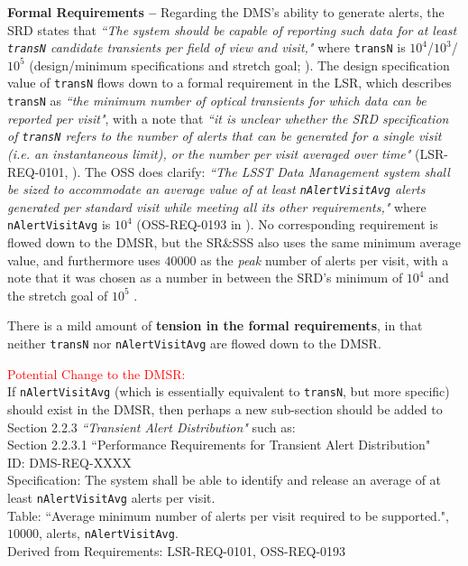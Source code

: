 \documentclass[DM,authoryear,toc]{lsstdoc}
\begin{document}
{\bf Formal Requirements --} Regarding the DMS's ability to generate alerts, the SRD states that {\it ``The system should be capable of reporting such data for at least {\tt transN} candidate transients per field of view and visit,"} where {\tt transN} is $10^4$/$10^3$/$10^5$ (design/minimum specifications and stretch goal; ). The design specification value of {\tt transN} flows down to a formal requirement in the LSR, which describes {\tt transN} as {\it ``the minimum number of optical transients for which data can be reported per visit"}, with a note that {\it ``it is unclear whether the SRD specification of {\tt transN} refers to the number of alerts that can be generated for a single visit (i.e. an instantaneous limit), or the number per visit averaged over time"} (LSR-REQ-0101, ). The OSS does clarify: {\it ``The LSST Data Management system shall be sized to accommodate an average value of at least {\tt nAlertVisitAvg} alerts generated per standard visit while meeting all its other requirements,"} where {\tt nAlertVisitAvg} is $10^4$ (OSS-REQ-0193 in ). No corresponding requirement is flowed down to the DMSR, but the SR\&SSS also uses the same minimum average value, and furthermore uses $40000$ as the {\it peak} number of alerts per visit, with a note that it was chosen as a number in between the SRD's minimum of $10^4$ and the stretch goal of $10^5$ . 

There is a mild amount of {\bf tension in the formal requirements}, in that neither {\tt transN} nor {\tt nAlertVisitAvg} are flowed down to the DMSR. 

\textcolor{red}{Potential Change to the DMSR:} \\
If {\tt nAlertVisitAvg} (which is essentially equivalent to {\tt transN}, but more specific) should exist in the DMSR, then perhaps a new sub-section should be added to Section 2.2.3 {\it ``Transient Alert Distribution"} such as: \\
Section 2.2.3.1 ``Performance Requirements for Transient Alert Distribution" \\
ID: DMS-REQ-XXXX \\ 
Specification: The system shall be able to identify and release an average of at least {\tt nAlertVisitAvg} alerts per visit. \\
Table: ``Average minimum number of alerts per visit required to be supported.", $10000$, alerts, {\tt nAlertVisitAvg}. \\
Derived from Requirements: LSR-REQ-0101, OSS-REQ-0193
\end{document}
